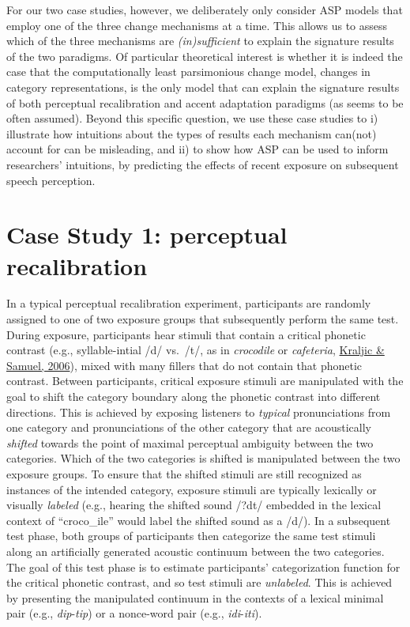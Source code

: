 \documentclass[
  11pt,
  english,
  man,floatsintext]{apa6}
\begin{document}
For our two case studies, however, we deliberately only consider ASP models that employ one of the three change mechanisms at a time. This allows us to assess which of the three mechanisms are \emph{(in)sufficient} to explain the signature results of the two paradigms. Of particular theoretical interest is whether it is indeed the case that the computationally least parsimonious change model, changes in category representations, is the only model that can explain the signature results of both perceptual recalibration and accent adaptation paradigms (as seems to be often assumed). Beyond this specific question, we use these case studies to i) illustrate how intuitions about the types of results each mechanism can(not) account for can be misleading, and ii) to show how ASP can be used to inform researchers' intuitions, by predicting the effects of recent exposure on subsequent speech perception.

\hypertarget{sec:PR}{%
\section{Case Study 1: perceptual recalibration}\label{sec:PR}}

In a typical perceptual recalibration experiment, participants are randomly assigned to one of two exposure groups that subsequently perform the same test. During exposure, participants hear stimuli that contain a critical phonetic contrast (e.g., syllable-intial /d/ vs.~/t/, as in \emph{croco\emph{d}ile} or \emph{cafe\emph{t}eria}, \protect\hyperlink{ref-kraljic-samuel2006}{Kraljic \& Samuel, 2006}), mixed with many fillers that do not contain that phonetic contrast. Between participants, critical exposure stimuli are manipulated with the goal to shift the category boundary along the phonetic contrast into different directions. This is achieved by exposing listeners to \emph{typical} pronunciations from one category and pronunciations of the other category that are acoustically \emph{shifted} towards the point of maximal perceptual ambiguity between the two categories. Which of the two categories is shifted is manipulated between the two exposure groups. To ensure that the shifted stimuli are still recognized as instances of the intended category, exposure stimuli are typically lexically or visually \emph{labeled} (e.g., hearing the shifted sound /?dt/ embedded in the lexical context of ``croco\_ile'' would label the shifted sound as a /d/). In a subsequent test phase, both groups of participants then categorize the same test stimuli along an artificially generated acoustic continuum between the two categories. The goal of this test phase is to estimate participants' categorization function for the critical phonetic contrast, and so test stimuli are \emph{unlabeled}. This is achieved by presenting the manipulated continuum in the contexts of a lexical minimal pair (e.g., \emph{dip}-\emph{tip}) or a nonce-word pair (e.g., \emph{idi}-\emph{iti}).
\end{document}

